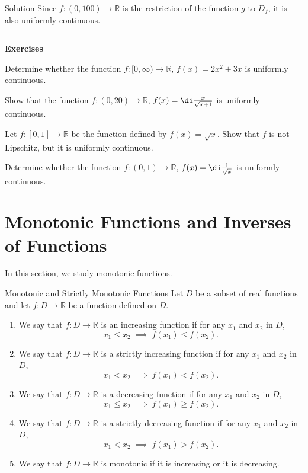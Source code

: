 \begin{example}
\begin{solution}{Solution}
Since $f:(0, 100)\rightarrow\mathbb{R}$ is the restriction of the function $g$ to $D_f$, it is also uniformly continuous.
\end{solution}
\vspace{0.5cm}
\hrule
\vspace{0.5cm}
\noindent
{\bf \large Exercises  \thesection}
\setcounter{myquestion}{1}

\begin{question}{\themyquestion}
Determine whether the function $f:[0, \infty)\rightarrow \mathbb{R}$, $f(x)=2x^2+3x$ is uniformly continuous.
\end{question}
\atc
\begin{question}{\themyquestion}
Show that the function $f:(0, 20)\rightarrow \mathbb{R}$, $f(x)=\di\frac{x}{\sqrt{x+1}}$ is uniformly continuous.
\end{question}
\atc
 \begin{question}{\themyquestion}
Let $f:[0,1]\rightarrow\mathbb{R}$ be the function defined by $f(x)=\sqrt{x}$.
Show  that $f$ is not Lipschitz, but it is uniformly continuous.
\end{question}
\atc
\begin{question}{\themyquestion}
Determine whether the function $f:(0, 1)\rightarrow \mathbb{R}$, $f(x)=\di\frac{1}{\sqrt{x}}$ is uniformly continuous.
\end{question}



 
\vp


\section{Monotonic Functions and Inverses of  Functions}\label{sec2.6}

In this section, we study monotonic functions.
\begin{definition}{Monotonic    and Strictly Monotonic Functions}
Let $D$ be a subset of real functions and let $f:D\rightarrow\mathbb{R}$ be a function defined on $D$.
\begin{enumerate}[1.]
\item
We say that $f:D\to\mathbb{R}$ is an increasing function if for any $x_1$ and $x_2$ in $D$,
\[x_1\leq x_2\;\implies\;f(x_1)\leq f(x_2).\]
 
\item
We say that $f:D\to\mathbb{R}$ is a strictly increasing function if for any $x_1$ and $x_2$ in $D$,
\[x_1<x_2\;\implies\;f(x_1)< f(x_2).\]
 
\item
We say that $f:D\to\mathbb{R}$ is a decreasing function if for any $x_1$ and $x_2$ in $D$,
\[x_1\leq x_2\;\implies\;f(x_1)\geq f(x_2).\]
 \item
We say that $f:D\to\mathbb{R}$ is a strictly decreasing function if for any $x_1$ and $x_2$ in $D$,
\[x_1<x_2\;\implies\;f(x_1)> f(x_2).\]
\item We say that $f:D\to\mathbb{R}$ is monotonic if it is increasing or it is decreasing.
  


\end{enumerate}
\end{definition}
\end{example}

